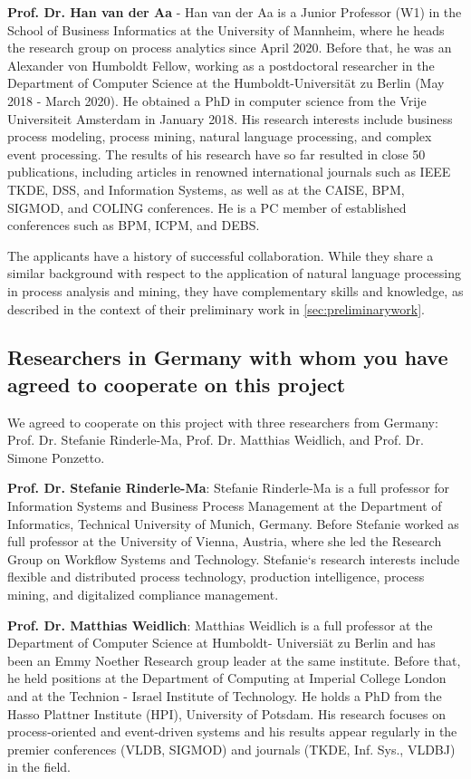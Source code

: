 \textbf{Prof. Dr. Han van der Aa} - Han van der Aa is a Junior Professor (W1) in the School of Business Informatics at the University of Mannheim, where he heads the research group on process analytics since April 2020. Before that, he was an Alexander von Humboldt Fellow, working as a postdoctoral researcher in the Department of Computer Science at the Humboldt-Universität zu Berlin (May 2018 - March 2020). He obtained a PhD in computer science from the Vrije Universiteit Amsterdam in January 2018. His research interests include business process modeling, process mining, natural language processing, and complex event processing. 
The results of his research have so far resulted in close 50 publications, including articles in 
renowned international journals such as IEEE TKDE, DSS, and Information Systems, as well as at the CAISE, BPM, SIGMOD, and COLING conferences.
He is a PC member of established conferences such as BPM, ICPM, and DEBS.


The applicants have a history of successful collaboration. While they share a similar background with respect to the application of natural language processing in process analysis and mining, they  have complementary skills and knowledge, as described in the context of their preliminary work in \autoref{sec:preliminarywork}.

 \subsection{Researchers in Germany with whom you have agreed to cooperate on this project}
\label{sec:collab:germany}

We agreed to cooperate on this project with three researchers from Germany: Prof. Dr. Stefanie Rinderle-Ma, Prof. Dr. Matthias Weidlich, and Prof. Dr. Simone Ponzetto. 

\textbf{Prof. Dr. Stefanie Rinderle-Ma}: Stefanie Rinderle-Ma is a full professor for Information Systems and Business Process Management at the Department of Informatics, Technical University of Munich, Germany. Before Stefanie worked as full professor at the University of Vienna, Austria, where she led the Research Group on Workflow Systems and Technology. Stefanie‘s research interests include flexible and distributed process technology, production intelligence, process mining, and digitalized compliance management.
 
\textbf{Prof. Dr. Matthias Weidlich}: Matthias Weidlich is a full professor at the Department of Computer Science at Humboldt- Universi\"at zu Berlin and has been an Emmy Noether Research group leader at the same institute. Before that, he held positions at the Department of Computing at Imperial College London and at the Technion - Israel Institute of Technology. He holds a PhD from the Hasso Plattner Institute (HPI), University of Potsdam. His research focuses on process-oriented and event-driven systems and his results appear regularly in the premier conferences (VLDB, SIGMOD) and journals (TKDE, Inf. Sys., VLDBJ) in the field.

